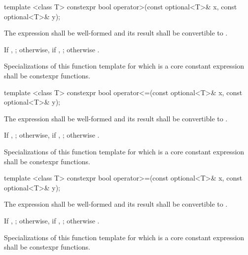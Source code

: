 %
\begin{itemdecl}
template <class T> constexpr bool operator>(const optional<T>& x, const optional<T>& y);
\end{itemdecl}

\begin{itemdescr}
\pnum
\requires
The expression  shall be well-formed and
its result shall be convertible to .

\pnum
\returns
If , ;
otherwise, if , ;
otherwise .

\pnum
\remarks
Specializations of this function template
for which  is a core constant expression
shall be constexpr functions.
\end{itemdescr}

%
\begin{itemdecl}
template <class T> constexpr bool operator<=(const optional<T>& x, const optional<T>& y);
\end{itemdecl}

\begin{itemdescr}
\pnum
\requires
The expression  shall be well-formed and
its result shall be convertible to .

\pnum
\returns
If , ;
otherwise, if , ;
otherwise .

\pnum
\remarks
Specializations of this function template
for which  is a core constant expression
shall be constexpr functions.
\end{itemdescr}

%
\begin{itemdecl}
template <class T> constexpr bool operator>=(const optional<T>& x, const optional<T>& y);
\end{itemdecl}

\begin{itemdescr}
\pnum
\requires
The expression  shall be well-formed and
its result shall be convertible to .

\pnum
\returns
If , ;
otherwise, if , ;
otherwise .

\pnum
\remarks
Specializations of this function template
for which  is a core constant expression
shall be constexpr functions.
\end{itemdescr}

